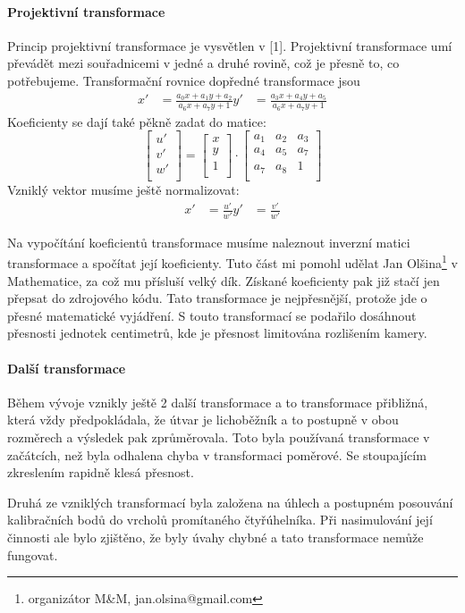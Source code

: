 \documentclass[twoside,12pt]{article}
\newcommand{\podpodsekce}[1]{\paragraph{#1}\quad\vskip 6pt}
\begin{document}
\podpodsekce{ Projektivní transformace}
Princip projektivní transformace je vysvětlen v [1]. Projektivní transformace umí převádět mezi souřadnicemi v jedné a druhé rovině, což je přesně to, co potřebujeme. Transformační rovnice dopředné transformace jsou 
\begin{align*}
 x' &= \frac{a_0x+a_1y+a_2}{a_6x+a_7y+1}
 y' &= \frac{a_3x+a_4y+a_5}{a_6x+a_7y+1}
\end{align*}
Koeficienty se dají také pěkně zadat do matice:
$$\left[
 \begin{array}{c} 
  u'\\
  v'\\
  w'\\
 \end{array}
\right]
=
\left[
 \begin{array}{c}
 x\\
 y\\
 1\\
 \end{array}
\right]
\cdot
\left[
 \begin{array}{ccc}
 a_1 & a_2 & a_3\\
 a_4 & a_5 & a_7\\
 a_7 & a_8 & 1\\
 \end{array}
\right]
  $$
Vzniklý vektor musíme ještě normalizovat:
\begin{align*}
 x' &= \frac{u'}{w'}
 y' &= \frac{v'}{w'}
\end{align*}

Na vypočítání koeficientů transformace musíme naleznout inverzní matici transformace a spočítat její koeficienty. Tuto část mi pomohl udělat Jan Olšina\footnote{organizátor M\&M, jan.olsina@gmail.com} v Mathematice, za což mu přísluší velký dík. Získané koeficienty pak již stačí jen přepsat do zdrojového kódu. Tato transformace je nejpřesnější, protože jde o přesné matematické vyjádření. S touto transformací se podařilo dosáhnout přesnosti jednotek centimetrů, kde je přesnost limitována rozlišením kamery.

\podpodsekce{ Další transformace}
Během vývoje vznikly ještě 2 další transformace a to transformace přibližná, která vždy předpokládala, že útvar je lichoběžník a to postupně v obou rozměrech a výsledek pak zprůměrovala. Toto byla používaná transformace v začátcích, než byla odhalena chyba v transformaci poměrové. Se stoupajícím zkreslením rapidně klesá přesnost. 

Druhá ze vzniklých transformací byla založena na úhlech a postupném posouvání kalibračních bodů do vrcholů promítaného čtyřúhelníka. Při nasimulování její činnosti ale bylo zjištěno, že byly úvahy chybné a tato transformace nemůže fungovat.
\end{document}
